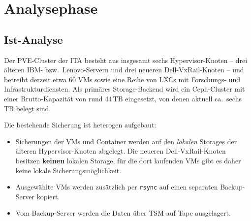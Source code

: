 \section{Analysephase}
\label{sec:Analysephase}


\subsection{Ist-Analyse}
\label{sec:IstAnalyse}
Der \ac{PVE}-Cluster der \ac{ITA} besteht aus insgesamt sechs
Hypervisor-Knoten -- drei älteren IBM- bzw.\ Lenovo-Servern und drei
neueren Dell-VxRail-Knoten -- und betreibt derzeit etwa 60 \acp{VM}
sowie eine Reihe von \acp{LXC} mit Forschungs- und
Infrastrukturdiensten.
Als primäres Storage-Backend wird ein Ceph-Cluster mit einer
Brutto-Kapazität von rund 44\,TB eingesetzt, von denen aktuell ca.\
sechs\,TB belegt sind.

Die bestehende Sicherung ist heterogen aufgebaut:
\begin{itemize}
    \item Sicherungen der \acp{VM} und Container werden auf den
          \emph{lokalen} Storages der älteren Hypervisor-Knoten
          abgelegt. Die neueren Dell-VxRail-Knoten besitzen
          \textbf{keinen} lokalen Storage, für die dort laufenden
          \acp{VM} gibt es daher keine lokale Sicherungsmöglichkeit.
    \item Ausgewählte \acp{VM} werden zusätzlich per \texttt{rsync} auf
          einen separaten Backup-Server kopiert.
    \item Vom Backup-Server werden die Daten über \ac{TSM} auf Tape
          ausgelagert.
\end{itemize}

